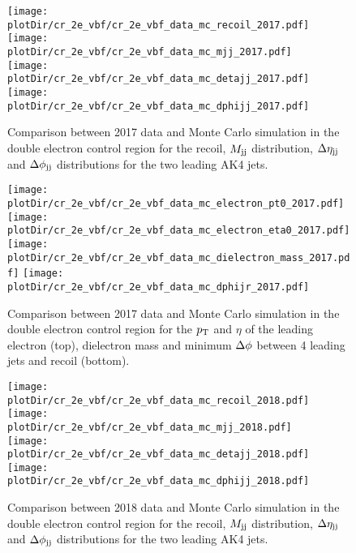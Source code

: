 \begin{figure}[htbp]
    \begin{center}
        \texttt{[image: \\plotDir/cr\_2e\_vbf/cr\_2e\_vbf\_data\_mc\_recoil\_2017.pdf]}
        \texttt{[image: \\plotDir/cr\_2e\_vbf/cr\_2e\_vbf\_data\_mc\_mjj\_2017.pdf]} \\
        \texttt{[image: \\plotDir/cr\_2e\_vbf/cr\_2e\_vbf\_data\_mc\_detajj\_2017.pdf]}
        \texttt{[image: \\plotDir/cr\_2e\_vbf/cr\_2e\_vbf\_data\_mc\_dphijj\_2017.pdf]}
    \end{center}
    \caption{Comparison between 2017 data and Monte Carlo simulation in the double electron control region for
        the recoil, $M_{\textrm{jj}}$ distribution, $\Delta \eta_{\textrm{jj}}$ and $\Delta \phi_{\textrm{jj}}$ distributions for the two leading AK4 jets.}
    \label{fig:cr_2e_vbf_2017_mtr}
\end{figure}

\begin{figure}[htbp]
    \begin{center}
        \texttt{[image: \\plotDir/cr\_2e\_vbf/cr\_2e\_vbf\_data\_mc\_electron\_pt0\_2017.pdf]}
        \texttt{[image: \\plotDir/cr\_2e\_vbf/cr\_2e\_vbf\_data\_mc\_electron\_eta0\_2017.pdf]}
        \texttt{[image: \\plotDir/cr\_2e\_vbf/cr\_2e\_vbf\_data\_mc\_dielectron\_mass\_2017.pdf]}
        \texttt{[image: \\plotDir/cr\_2e\_vbf/cr\_2e\_vbf\_data\_mc\_dphijr\_2017.pdf]}
    \end{center}
    \caption{Comparison between 2017 data and Monte Carlo simulation in the double electron control region for
        the $p_{\textrm{T}}$ and $\eta$ of the leading electron (top), dielectron mass and minimum $\Delta \phi$ between 4 leading jets and recoil (bottom).}
    \label{fig:cr_2e_vbf_2017_mtr_2}
\end{figure}

\begin{figure}[htbp]
    \begin{center}
        \texttt{[image: \\plotDir/cr\_2e\_vbf/cr\_2e\_vbf\_data\_mc\_recoil\_2018.pdf]}
        \texttt{[image: \\plotDir/cr\_2e\_vbf/cr\_2e\_vbf\_data\_mc\_mjj\_2018.pdf]} \\
        \texttt{[image: \\plotDir/cr\_2e\_vbf/cr\_2e\_vbf\_data\_mc\_detajj\_2018.pdf]}
        \texttt{[image: \\plotDir/cr\_2e\_vbf/cr\_2e\_vbf\_data\_mc\_dphijj\_2018.pdf]}
    \end{center}
    \caption{Comparison between 2018 data and Monte Carlo simulation in the double electron control region for
        the recoil, $M_{\textrm{jj}}$ distribution, $\Delta \eta_{\textrm{jj}}$ and $\Delta \phi_{\textrm{jj}}$ distributions for the two leading AK4 jets.}
    \label{fig:cr_2e_vbf_2018_mtr}
\end{figure}

